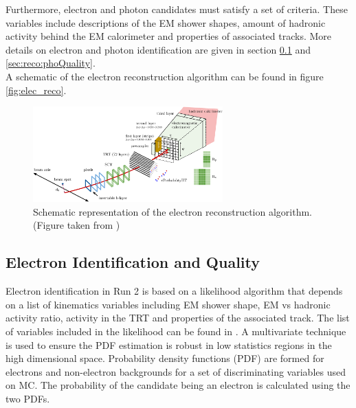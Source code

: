 \indent Furthermore, electron and photon candidates must satisfy a set of criteria.  These variables include descriptions of the EM shower shapes, amount of hadronic activity behind the EM calorimeter and properties of associated tracks.  More details on electron and photon identification are given in section \ref{sec:reco:eleQuality} and \ref{sec:reco:phoQuality}. \\

\indent A schematic of the electron reconstruction algorithm can be found in figure \ref{fig:elec_reco}. \\

\begin{figure}[!hp] 
\begin{center}
\includegraphics[width=0.65\textwidth]{figures/EMCalib/Reco_Diag.png}
\caption{Schematic representation of the electron reconstruction algorithm. (Figure taken from \cite{EleID}) }
\label{fig:elec_rec}
\end{center}
\end{figure}

\subsection{Electron Identification and Quality}
\label{sec:reco:eleQuality}

\indent Electron identification in Run 2 is based on a likelihood algorithm that depends on a list of kinematics variables including EM shower shape, EM vs hadronic activity ratio, activity in the TRT and properties of the associated track.  The list of variables included in the likelihood can be found in \cite{EleID}.  A multivariate technique is used to ensure the PDF estimation is robust in low statistics regions in the high dimensional space.\cite{TMVA}  Probability density functions (PDF) are formed for electrons and non-electron backgrounds for a set of discriminating variables used on MC.  The probability of the candidate being an electron is calculated using the two PDFs.  \\

